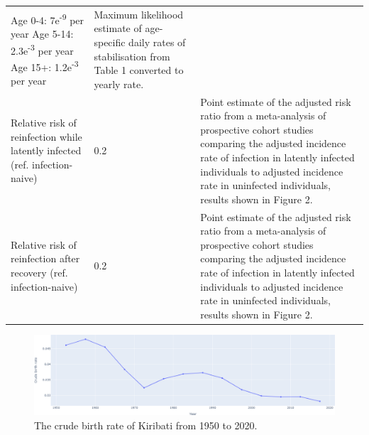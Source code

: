\documentclass{article}
\begin{document}
\begin{table}[!htp]
\begin{tabularx}{\textwidth}{ X  X  X }
\begin{minipage}[t]{0.3\textwidth}
            Age 0-4: 7e\textsuperscript{-9} per year \newline
            Age 5-14: 2.3e\textsuperscript{-3} per year  \newline
            Age 15+: 1.2e\textsuperscript{-3} per year \newline
        \end{minipage}
        &
        \begin{minipage}[t]{0.3\textwidth}
            Maximum likelihood estimate of age-specific daily rates of stabilisation from Table 1 converted to yearly rate. \cite{ragonnet-2017}
        \end{minipage} \\
        Relative risk of reinfection while latently infected (ref. infection-naive) & 0.2 &
        \begin{minipage}[t]{0.3\textwidth}
            Point estimate of the adjusted risk ratio from a meta-analysis of prospective cohort studies comparing the adjusted incidence rate of 
            infection in latently infected individuals to adjusted incidence rate in uninfected individuals, results shown in Figure 2. \cite{andrews-2012}
        \end{minipage} \\
        Relative risk of reinfection after recovery (ref. infection-naive) & 0.2 & \begin{minipage}[t]{0.3\textwidth}
            Point estimate of the adjusted risk ratio from a meta-analysis of prospective cohort studies comparing the adjusted incidence rate of 
            infection in latently infected individuals to adjusted incidence rate in uninfected individuals, results shown in Figure 2. \cite{andrews-2012} 
        \end{minipage} \\
        \hline
	\end{tabularx}
\end{table}

\begin{figure}[!htp]
   \includegraphics[width=\textwidth,keepaspectratio]{images/cbr.png}
    \caption{The crude birth rate of Kiribati from 1950 to 2020.}
    \label{fig:cbr}
\end{figure}
\end{document}
